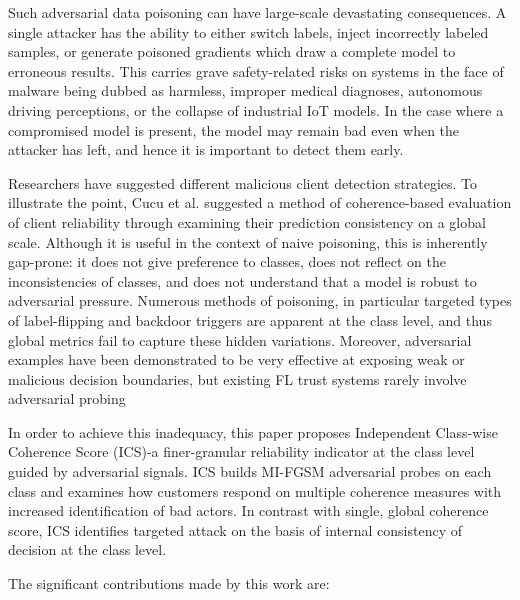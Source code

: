 \documentclass[conference]{IEEEtran}
\begin{document}
Such adversarial data poisoning can have large-scale devastating consequences. A single attacker has the ability to either switch labels, inject incorrectly labeled samples, or generate poisoned gradients which draw a complete model to erroneous results. This carries grave safety-related risks on systems in the face of malware being dubbed as harmless, improper medical diagnoses, autonomous driving perceptions, or the collapse of industrial IoT models. In the case where a compromised model is present, the model may remain bad even when the attacker has left, and hence it is important to detect them early.

Researchers have suggested different malicious client detection strategies. To illustrate the point, Cucu et al. suggested a method of coherence-based evaluation of client reliability through examining their prediction consistency on a global scale. Although it is useful in the context of naive poisoning, this is inherently gap-prone: it does not give preference to classes, does not reflect on the inconsistencies of classes, and does not understand that a model is robust to adversarial pressure. Numerous methods of poisoning, in particular targeted types of label-flipping and backdoor triggers are apparent at the class level, and thus global metrics fail to capture these hidden variations. Moreover, adversarial examples have been demonstrated to be very effective at exposing weak or malicious decision boundaries, but existing FL trust systems rarely involve adversarial probing\cite{ovi2025robust} 

In order to achieve this inadequacy, this paper proposes Independent Class-wise Coherence Score (ICS)-a finer-granular reliability indicator at the class level guided by adversarial signals. ICS builds MI-FGSM adversarial probes on each class and examines how customers respond on multiple coherence measures with increased identification of bad actors. In contrast with single, global coherence score, ICS identifies targeted attack on the basis of internal consistency of decision at the class level.

The significant contributions made by this work are:
\end{document}
